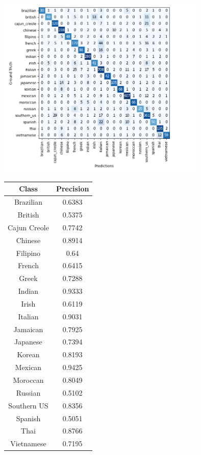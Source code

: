 \documentclass{article}
\begin{document}
\begin{minipage}{\textwidth}
\begin{minipage}[b]{0.7\textwidth}
\centering
\includegraphics[width=10cm]{cm.PNG}
\label{img:cm}
\end{minipage}
\hfill
\begin{minipage}[b]{0.29\textwidth}
\centering
\begin{tabular}{|c|c|}
\hline
\textbf{Class} & \textbf{Precision} \\ \hline
Brazilian      & 0.6383             \\ \hline
British        & 0.5375             \\ \hline
Cajun Creole   & 0.7742             \\ \hline
Chinese        & 0.8914             \\ \hline
Filipino       & 0.64               \\ \hline
French         & 0.6415             \\ \hline
Greek          & 0.7288             \\ \hline
Indian         & 0.9333             \\ \hline
Irish          & 0.6119             \\ \hline
Italian        & 0.9031             \\ \hline
Jamaican       & 0.7925             \\ \hline
Japanese       & 0.7394             \\ \hline
Korean         & 0.8193             \\ \hline
Mexican        & 0.9425             \\ \hline
Moroccan       & 0.8049             \\ \hline
Russian        & 0.5102             \\ \hline
Southern US    & 0.8356             \\ \hline
Spanish        & 0.5051             \\ \hline
Thai           & 0.8766             \\ \hline
Vietnamese     & 0.7195             \\ \hline
\end{tabular}
\label{precision}
\end{minipage}
\end{minipage}
\end{document}
